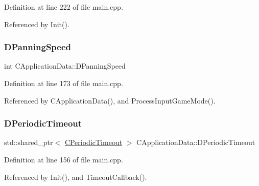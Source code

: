 Definition at line 222 of file main.\+cpp.



Referenced by Init().

\hypertarget{classCApplicationData_a9e07e8374b20abfbb57f656e92be8404}{}\label{classCApplicationData_a9e07e8374b20abfbb57f656e92be8404} 
\subsubsection{\texorpdfstring{D\+Panning\+Speed}{DPanningSpeed}}
{\footnotesize\ttfamily int C\+Application\+Data\+::\+D\+Panning\+Speed\hspace{0.3cm}{\ttfamily [protected]}}



Definition at line 173 of file main.\+cpp.



Referenced by C\+Application\+Data(), and Process\+Input\+Game\+Mode().

\hypertarget{classCApplicationData_a0265cb7aba9f099faed2a1c8ee588d33}{}\label{classCApplicationData_a0265cb7aba9f099faed2a1c8ee588d33} 
\subsubsection{\texorpdfstring{D\+Periodic\+Timeout}{DPeriodicTimeout}}
{\footnotesize\ttfamily std\+::shared\+\_\+ptr$<$ \hyperlink{classCPeriodicTimeout}{C\+Periodic\+Timeout} $>$ C\+Application\+Data\+::\+D\+Periodic\+Timeout\hspace{0.3cm}{\ttfamily [protected]}}



Definition at line 156 of file main.\+cpp.



Referenced by Init(), and Timeout\+Callback().

\hypertarget{classCApplicationData_a53550939b20cba70570f113e4d1c5d02}{}\label{classCApplicationData_a53550939b20cba70570f113e4d1c5d02} 
